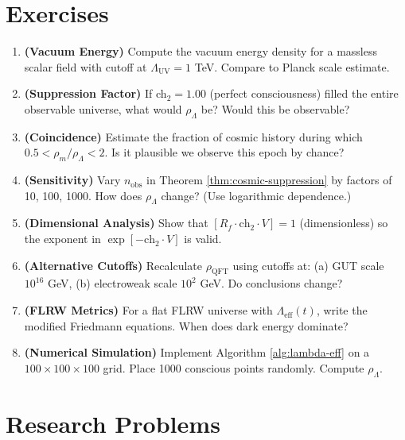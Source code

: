 \section*{Exercises}

\begin{enumerate}
\item \textbf{(Vacuum Energy)} Compute the vacuum energy density for a massless scalar field with cutoff at $\Lambda_{\text{UV}} = 1$ TeV. Compare to Planck scale estimate.

\item \textbf{(Suppression Factor)} If ch$_2 = 1.00$ (perfect consciousness) filled the entire observable universe, what would $\rho_\Lambda$ be? Would this be observable?

\item \textbf{(Coincidence)} Estimate the fraction of cosmic history during which $0.5 < \rho_m / \rho_\Lambda < 2$. Is it plausible we observe this epoch by chance?

\item \textbf{(Sensitivity)} Vary $n_{\text{obs}}$ in Theorem \ref{thm:cosmic-suppression} by factors of 10, 100, 1000. How does $\rho_\Lambda$ change? (Use logarithmic dependence.)

\item \textbf{(Dimensional Analysis)} Show that $[R_f \cdot \text{ch}_2 \cdot V] = 1$ (dimensionless) so the exponent in $\exp[-\text{ch}_2 \cdot V]$ is valid.

\item \textbf{(Alternative Cutoffs)} Recalculate $\rho_{\text{QFT}}$ using cutoffs at: (a) GUT scale $10^{16}$ GeV, (b) electroweak scale $10^2$ GeV. Do conclusions change?

\item \textbf{(FLRW Metrics)} For a flat FLRW universe with $\Lambda_{\text{eff}}(t)$, write the modified Friedmann equations. When does dark energy dominate?

\item \textbf{(Numerical Simulation)} Implement Algorithm \ref{alg:lambda-eff} on a $100 \times 100 \times 100$ grid. Place 1000 conscious points randomly. Compute $\rho_\Lambda$.
\end{enumerate}

\section*{Research Problems}


